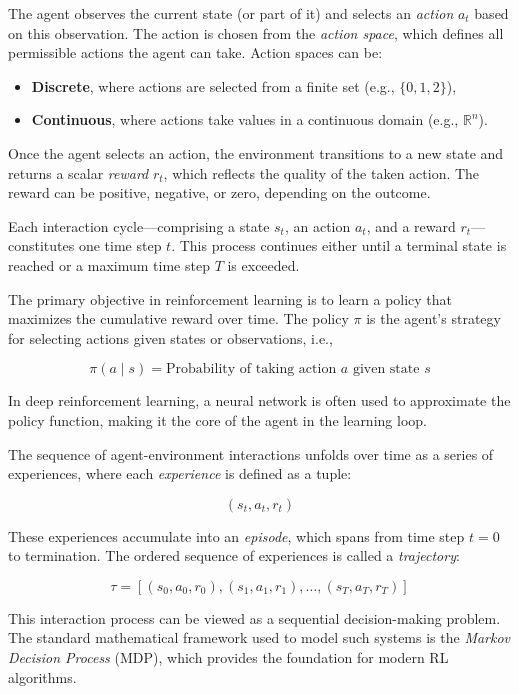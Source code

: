 \documentclass[a4paper,oneside]{book}
\theoremstyle{definition}
\begin{document}
The agent observes the current state (or part of it) and selects an \textit{action} \( a_t \) based on this observation. The action is chosen from the \textit{action space}, which defines all permissible actions the agent can take. Action spaces can be:

\begin{itemize}
    \item \textbf{Discrete}, where actions are selected from a finite set (e.g., \( \{0, 1, 2\} \)),
    \item \textbf{Continuous}, where actions take values in a continuous domain (e.g., \( \mathbb{R}^n \)).
\end{itemize}

Once the agent selects an action, the environment transitions to a new state and returns a scalar \textit{reward} \( r_t \), which reflects the quality of the taken action. The reward can be positive, negative, or zero, depending on the outcome.

Each interaction cycle—comprising a state \( s_t \), an action \( a_t \), and a reward \( r_t \)—constitutes one time step \( t \). This process continues either until a terminal state is reached or a maximum time step \( T \) is exceeded.

The primary objective in reinforcement learning is to learn a policy that maximizes the cumulative reward over time. The policy \( \pi \) is the agent’s strategy for selecting actions given states or observations, i.e.,

\[
\pi(a \mid s) = \text{Probability of taking action } a \text{ given state } s
\]

In deep reinforcement learning, a neural network is often used to approximate the policy function, making it the core of the agent in the learning loop.

The sequence of agent-environment interactions unfolds over time as a series of experiences, where each \textit{experience} is defined as a tuple:

\[
(s_t, a_t, r_t)
\]

These experiences accumulate into an \textit{episode}, which spans from time step \( t = 0 \) to termination. The ordered sequence of experiences is called a \textit{trajectory}:

\[
\tau = [(s_0, a_0, r_0), (s_1, a_1, r_1), \ldots, (s_T, a_T, r_T)]
\]

This interaction process can be viewed as a sequential decision-making problem. The standard mathematical framework used to model such systems is the \textit{Markov Decision Process} (MDP), which provides the foundation for modern RL algorithms.
\end{document}
